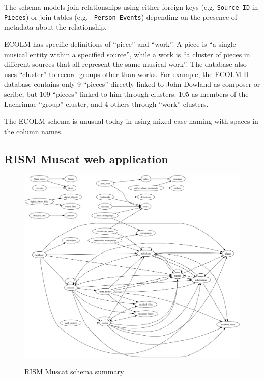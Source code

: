 \documentclass[sigconf, nonacm=true]{acmart}
\begin{document}
\begin{sloppypar}
  The schema models join relationships using either foreign keys
  (e.g. {\tt Source ID} in {\tt Pieces}) or join tables (e.g. {\tt
    Person\_Events}) depending on the presence of metadata about the
  relationship.

  ECOLM has specific definitions of ``piece'' and ``work''. A piece is
  ``a single musical entity within a specified source'', while a work
  is ``a cluster of pieces in different sources that all represent the
  same musical work''. The database also uses ``cluster'' to record
  groups other than works. For example, the ECOLM II database contains
  only 9 ``pieces'' directly linked to John Dowland as composer or
  scribe, but 109 ``pieces'' linked to him through clusters: 105 as
  members of the Lachrimae ``group'' cluster, and 4 others through
  ``work'' clusters.

  The ECOLM schema is unusual today in using mixed-case naming with
  spaces in the column names.
  
  \clearpage

  \subsection{RISM Muscat web application}\label{muscat-data}
  
  \begin{figure}[b]
  \centering
  \caption{RISM Muscat schema summary}
  \includegraphics[width=\textwidth]{plot/muscat}
  \label{fig:muscat}
  \end{figure}


\end{sloppypar}
\end{document}
